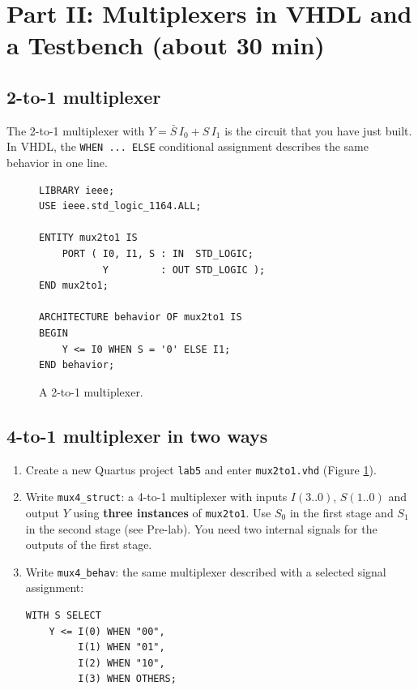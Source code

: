 \documentclass{article}
\begin{document}
\section*{Part II: Multiplexers in VHDL and a Testbench (about 30 min)}

\subsection*{2-to-1 multiplexer}
The 2-to-1 multiplexer with $Y = \bar{S}\,I_0 + S\,I_1$ is the circuit that you have just built. In VHDL, the \texttt{WHEN ... ELSE} conditional assignment describes the same behavior in one line.

\begin{figure}[H]
    \centering
    \begin{verbatim}
LIBRARY ieee;
USE ieee.std_logic_1164.ALL;

ENTITY mux2to1 IS
    PORT ( I0, I1, S : IN  STD_LOGIC;
           Y         : OUT STD_LOGIC );
END mux2to1;

ARCHITECTURE behavior OF mux2to1 IS
BEGIN
    Y <= I0 WHEN S = '0' ELSE I1;
END behavior;
    \end{verbatim}
    \caption{A 2-to-1 multiplexer.}
    \label{fig:mux2}
\end{figure}

\subsection*{4-to-1 multiplexer in two ways}
\begin{enumerate}
    \item Create a new Quartus project \texttt{lab5} and enter \texttt{mux2to1.vhd} (Figure \ref{fig:mux2}).
    \item Write \texttt{mux4\_struct}: a 4-to-1 multiplexer with inputs $I(3..0)$, $S(1..0)$ and output $Y$ using \textbf{three instances} of \texttt{mux2to1}. Use $S_0$ in the first stage and $S_1$ in the second stage (see Pre-lab). You need two internal signals for the outputs of the first stage.
    \item Write \texttt{mux4\_behav}: the same multiplexer described with a selected signal assignment:
\begin{verbatim}
WITH S SELECT
    Y <= I(0) WHEN "00",
         I(1) WHEN "01",
         I(2) WHEN "10",
         I(3) WHEN OTHERS;
\end{verbatim}
\end{enumerate}
\end{document}
